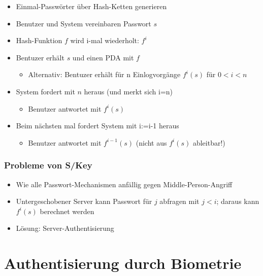\documentclass[openany]{book}
\begin{document}
\begin{itemize}
    \item Einmal-Passwörter über Hash-Ketten generieren
    \item Benutzer und System vereinbaren Passwort $s$
    \item Hash-Funktion $f$ wird i-mal wiederholt: $f^i$
    \item Bentuzer erhält $s$ und einen PDA mit $f$
    \begin{itemize}
        \item Alternativ: Bentuzer erhält für n Einlogvorgänge $f^i(s)$ für $0<i<n$
    \end{itemize}
    \item System fordert mit $n$ heraus (und merkt sich i=n)
    \begin{itemize}
        \item Benutzer antwortet mit $f^i(s)$
    \end{itemize}
    \item Beim nächsten mal fordert System mit i:=i-1 heraus
    \begin{itemize}
        \item Benutzer antwortet mit $f^{i-1}(s)$ (nicht aus $f^i(s)$ ableitbar!)
    \end{itemize}
\end{itemize}

\subsubsection{Probleme von S/Key}

\begin{itemize}
    \item Wie alle Passwort-Mechanismen anfällig gegen Middle-Person-Angriff
    \item Untergeschobener Server kann Passwort für $j$ abfragen mit $j<i$; daraus kann $f^i(s)$ berechnet werden
    \item Lösung: Server-Authentisierung
\end{itemize}

\section{Authentisierung durch Biometrie}
\end{document}
